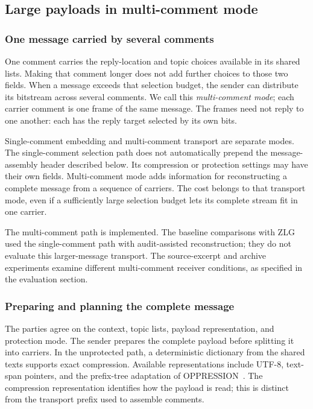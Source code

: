 \subsection{Large payloads in multi-comment mode}
\label{sec:multiframe}


\subsubsection{One message carried by several comments}
One comment carries the reply-location and topic choices available in its shared lists. Making that comment longer does not add further choices to those two fields. When a message exceeds that selection budget, the sender can distribute its bitstream across several comments. We call this \emph{multi-comment mode}; each carrier comment is one frame of the same message. The frames need not reply to one another: each has the reply target selected by its own bits.

Single-comment embedding and multi-comment transport are separate modes. The single-comment selection path does not automatically prepend the message-assembly header described below. Its compression or protection settings may have their own fields. Multi-comment mode adds information for reconstructing a complete message from a sequence of carriers. The cost belongs to that transport mode, even if a sufficiently large selection budget lets its complete stream fit in one carrier.

The multi-comment path is implemented. The baseline comparisons with ZLG~\cite{lin2024zero} used the single-comment path with audit-assisted reconstruction; they do not evaluate this larger-message transport. The source-excerpt and archive experiments examine different multi-comment receiver conditions, as specified in the evaluation section.

\subsubsection{Preparing and planning the complete message}
The parties agree on the context, topic lists, payload representation, and protection mode. The sender prepares the complete payload before splitting it into carriers. In the unprotected path, a deterministic dictionary from the shared texts supports exact compression. Available representations include UTF-8, text-span pointers, and the prefix-tree adaptation of OPPRESSION~\cite{zillien2024oppression}. The compression representation identifies how the payload is read; this is distinct from the transport prefix used to assemble comments.

